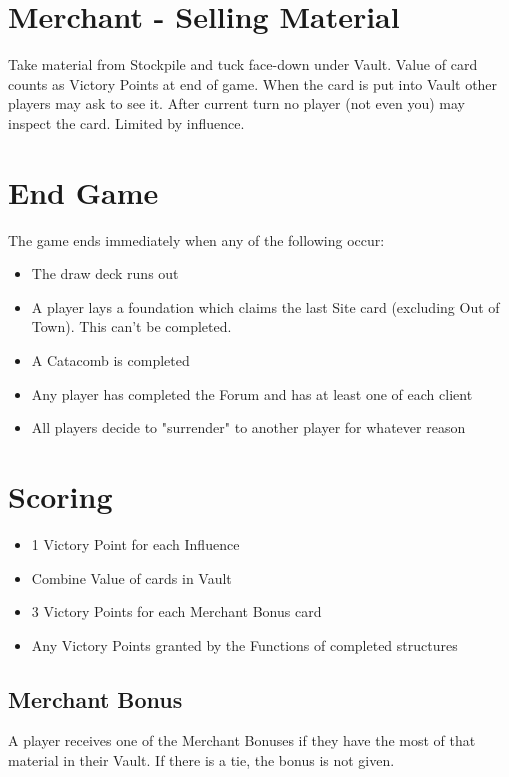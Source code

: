 \documentclass[12pt]{article}
\newenvironment{itemizeCustom}
{\begin{itemize}
  \setlength{\itemsep}{1pt}
  \setlength{\parskip}{0pt}
  \setlength{\parsep}{0pt}}
{\end{itemize}}
\begin{document}
\begin{multicols*}{2}
\section*{Merchant - Selling Material}
Take material from Stockpile and tuck face-down under Vault. Value of card counts as Victory Points at end of game. When the card is put into Vault other players may ask to see it. After current turn no player (not even you) may inspect the card. Limited by influence.

\section*{End Game}
The game ends immediately when any of the following occur:
\begin{itemizeCustom}
    \item The draw deck runs out
    \item A player lays a foundation which claims the last Site card (excluding Out of Town). This can't be completed.
    \item A Catacomb is completed
    \item Any player has completed the Forum and has at least one of each client
    \item All players decide to "surrender" to another player for whatever reason
\end{itemizeCustom}

\section*{Scoring}
\begin{itemizeCustom}
    \item 1 Victory Point for each Influence
    \item Combine Value of cards in Vault
    \item 3 Victory Points for each Merchant Bonus card
    \item Any Victory Points granted by the Functions of completed structures
\end{itemizeCustom}

\subsection*{Merchant Bonus}
A player receives one of the Merchant Bonuses if they have the most of that material in their Vault. If there is a tie, the bonus is not given.

\end{multicols*}
\end{document}
